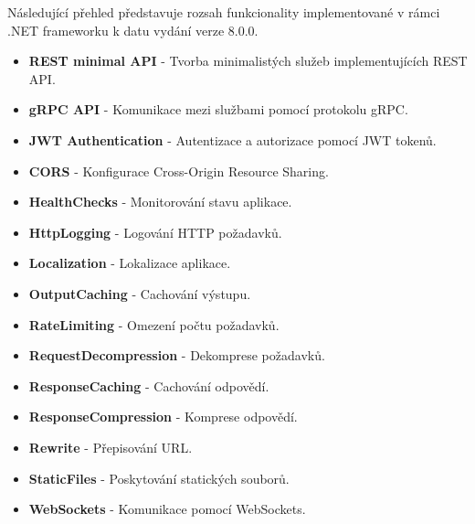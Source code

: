 
Následující přehled představuje rozsah funkcionality implementované v rámci .NET frameworku k datu vydání verze 8.0.0.

\begin{itemize}
    \item \textbf{REST minimal API} - Tvorba minimalistých služeb implementujících REST API.
    \item \textbf{gRPC API} - Komunikace mezi službami pomocí protokolu gRPC.
    \item \textbf{JWT Authentication} - Autentizace a autorizace pomocí JWT tokenů.
    \item \textbf{CORS} - Konfigurace Cross-Origin Resource Sharing.
    \item \textbf{HealthChecks} - Monitorování stavu aplikace.
    \item \textbf{HttpLogging} - Logování HTTP požadavků.
    \item \textbf{Localization} - Lokalizace aplikace.
    \item \textbf{OutputCaching} - Cachování výstupu.
    \item \textbf{RateLimiting} - Omezení počtu požadavků.
    \item \textbf{RequestDecompression} - Dekomprese požadavků.
    \item \textbf{ResponseCaching} - Cachování odpovědí.
    \item \textbf{ResponseCompression} - Komprese odpovědí.
    \item \textbf{Rewrite} - Přepisování URL.
    \item \textbf{StaticFiles} - Poskytování statických souborů.
    \item \textbf{WebSockets} - Komunikace pomocí WebSockets.
\end{itemize}
